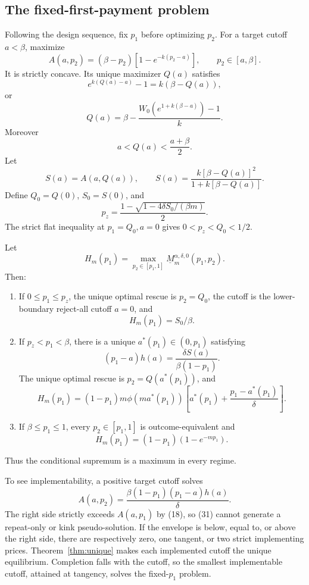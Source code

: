 \documentclass[mnsc,blindrev]{informs3}
\newcommand{\ph}{\phi}
\begin{document}
\subsection{The fixed-first-payment problem}

Following the design sequence, fix $p_1$ before optimizing $p_2$.  For a target
cutoff $a<\beta$, maximize
\[
 A(a,p_2)=(\beta-p_2)[1-e^{-k(p_2-a)}],
 \qquad p_2\in[a,\beta].                                   \tag{25}
\]
It is strictly concave.  Its unique maximizer $Q(a)$ satisfies
\[
 e^{k(Q(a)-a)}-1=k(\beta-Q(a)),                              \tag{26}
\]
or
\[
 Q(a)=\beta-
 \frac{W_0(e^{1+k(\beta-a)})-1}{k}.                         \tag{27}
\]
Moreover
\[
 a<Q(a)<\frac{a+\beta}{2}.
\]
Let
\[
 S(a)=A(a,Q(a)),\qquad
 S(a)=\frac{k[\beta-Q(a)]^2}{1+k[\beta-Q(a)]}.              \tag{28}
\]
Define $Q_0=Q(0)$, $S_0=S(0)$, and
\[
 p_z=\frac{1-\sqrt{1-4\delta S_0/(\beta m)}}2.             \tag{29}
\]
The strict flat inequality at $p_1=Q_0,a=0$ gives
$0<p_z<Q_0<1/2$.

\begin{theorem}
\label{thm:fixedp}
Let
\[
 H_m(p_1)=\max_{p_2\in[p_1,1]}
 \underline M_m^{\alpha,\delta,0}(p_1,p_2).
\]
Then:
\begin{enumerate}[label=(\roman*)]
 \item If $0\le p_1\le p_z$, the unique optimal rescue is $p_2=Q_0$, the
 cutoff is the lower-boundary reject-all cutoff $a=0$, and
 \[
 H_m(p_1)=S_0/\beta.
 \]
 \item If $p_z<p_1<\beta$, there is a unique $a^*(p_1)\in(0,p_1)$ satisfying
 \[
 (p_1-a)h(a)=\frac{\delta S(a)}{\beta(1-p_1)}.             \tag{30}
 \]
 The unique optimal rescue is $p_2=Q(a^*(p_1))$, and
 \[
 H_m(p_1)=(1-p_1)m\ph(ma^*(p_1))
 \left[a^*(p_1)+\frac{p_1-a^*(p_1)}\delta\right].
 \]
 \item If $\beta\le p_1\le1$, every $p_2\in[p_1,1]$ is outcome-equivalent and
 \[
 H_m(p_1)=(1-p_1)(1-e^{-mp_1}).
 \]
\end{enumerate}
Thus the conditional supremum is a maximum in every regime.
\end{theorem}

To see implementability, a positive target cutoff solves
\[
 A(a,p_2)=\frac{\beta(1-p_1)(p_1-a)h(a)}\delta.           \tag{31}
\]
The right side strictly exceeds $A(a,p_1)$ by (18), so (31) cannot generate a
repeat-only or kink pseudo-solution.  If the envelope is below, equal to, or
above the right side, there are respectively zero, one tangent, or two strict
implementing prices.  Theorem~\ref{thm:unique} makes each implemented cutoff
the unique equilibrium.  Completion falls with the cutoff, so the smallest
implementable cutoff, attained at tangency, solves the fixed-$p_1$ problem.
\end{document}
